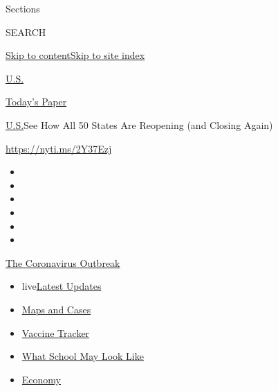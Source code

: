Sections

SEARCH

\protect\hyperlink{site-content}{Skip to
content}\protect\hyperlink{site-index}{Skip to site index}

\href{https://www.nytimes.com/section/us}{U.S.}

\href{https://myaccount.nytimes.com/auth/login?response_type=cookie\&client_id=vi}{}

\href{https://www.nytimes.com/section/todayspaper}{Today's Paper}

\href{/section/us}{U.S.}\textbar{}See How All 50 States Are Reopening
(and Closing Again)

\url{https://nyti.ms/2Y37Ezj}

\begin{itemize}
\item
\item
\item
\item
\item
\item
\end{itemize}

\href{https://www.nytimes.com/news-event/coronavirus?action=click\&pgtype=Article\&state=default\&region=TOP_BANNER\&context=storylines_menu}{The
Coronavirus Outbreak}

\begin{itemize}
\tightlist
\item
  live\href{https://www.nytimes.com/2020/08/01/world/coronavirus-covid-19.html?action=click\&pgtype=Article\&state=default\&region=TOP_BANNER\&context=storylines_menu}{Latest
  Updates}
\item
  \href{https://www.nytimes.com/interactive/2020/us/coronavirus-us-cases.html?action=click\&pgtype=Article\&state=default\&region=TOP_BANNER\&context=storylines_menu}{Maps
  and Cases}
\item
  \href{https://www.nytimes.com/interactive/2020/science/coronavirus-vaccine-tracker.html?action=click\&pgtype=Article\&state=default\&region=TOP_BANNER\&context=storylines_menu}{Vaccine
  Tracker}
\item
  \href{https://www.nytimes.com/interactive/2020/07/29/us/schools-reopening-coronavirus.html?action=click\&pgtype=Article\&state=default\&region=TOP_BANNER\&context=storylines_menu}{What
  School May Look Like}
\item
  \href{https://www.nytimes.com/live/2020/07/31/business/stock-market-today-coronavirus?action=click\&pgtype=Article\&state=default\&region=TOP_BANNER\&context=storylines_menu}{Economy}
\end{itemize}

